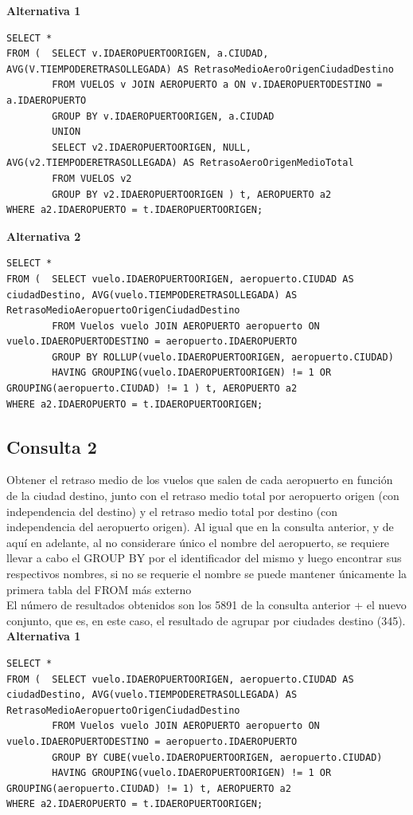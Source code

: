 \documentclass{article}
\begin{document}
\textbf{Alternativa 1}
\begin{lstlisting}
SELECT *
FROM (	SELECT v.IDAEROPUERTOORIGEN, a.CIUDAD, AVG(V.TIEMPODERETRASOLLEGADA) AS RetrasoMedioAeroOrigenCiudadDestino
		FROM VUELOS v JOIN AEROPUERTO a ON v.IDAEROPUERTODESTINO = a.IDAEROPUERTO 
		GROUP BY v.IDAEROPUERTOORIGEN, a.CIUDAD 
		UNION
		SELECT v2.IDAEROPUERTOORIGEN, NULL,  AVG(v2.TIEMPODERETRASOLLEGADA) AS RetrasoAeroOrigenMedioTotal
		FROM VUELOS v2 
		GROUP BY v2.IDAEROPUERTOORIGEN ) t, AEROPUERTO a2
WHERE a2.IDAEROPUERTO = t.IDAEROPUERTOORIGEN;
\end{lstlisting}

\textbf{Alternativa 2}
\begin{lstlisting}
SELECT *
FROM (	SELECT vuelo.IDAEROPUERTOORIGEN, aeropuerto.CIUDAD AS ciudadDestino, AVG(vuelo.TIEMPODERETRASOLLEGADA) AS RetrasoMedioAeropuertoOrigenCiudadDestino
		FROM Vuelos vuelo JOIN AEROPUERTO aeropuerto ON vuelo.IDAEROPUERTODESTINO = aeropuerto.IDAEROPUERTO 
		GROUP BY ROLLUP(vuelo.IDAEROPUERTOORIGEN, aeropuerto.CIUDAD)
		HAVING GROUPING(vuelo.IDAEROPUERTOORIGEN) != 1 OR GROUPING(aeropuerto.CIUDAD) != 1 ) t, AEROPUERTO a2
WHERE a2.IDAEROPUERTO = t.IDAEROPUERTOORIGEN;
\end{lstlisting}

\newpage
\subsection{Consulta 2}

Obtener el retraso medio de los vuelos que salen de cada aeropuerto en función de la ciudad destino, junto con el retraso medio total por aeropuerto origen (con independencia del destino) y el retraso medio total por destino (con independencia del aeropuerto origen).  Al igual que en la consulta anterior, y de aquí en adelante, al no considerare único el nombre del aeropuerto, se requiere llevar a cabo el GROUP BY por el identificador del mismo y luego encontrar sus respectivos nombres, si no se requerie el nombre se puede mantener únicamente la primera tabla del FROM más externo\\

El número de resultados obtenidos son los 5891 de la consulta anterior + el nuevo conjunto, que es, en este caso, el resultado de agrupar por ciudades destino (345).\\

\textbf{Alternativa 1}
\begin{lstlisting}
SELECT *
FROM (	SELECT vuelo.IDAEROPUERTOORIGEN, aeropuerto.CIUDAD AS ciudadDestino, AVG(vuelo.TIEMPODERETRASOLLEGADA) AS RetrasoMedioAeropuertoOrigenCiudadDestino
		FROM Vuelos vuelo JOIN AEROPUERTO aeropuerto ON vuelo.IDAEROPUERTODESTINO = aeropuerto.IDAEROPUERTO 
		GROUP BY CUBE(vuelo.IDAEROPUERTOORIGEN, aeropuerto.CIUDAD)
		HAVING GROUPING(vuelo.IDAEROPUERTOORIGEN) != 1 OR GROUPING(aeropuerto.CIUDAD) != 1) t, AEROPUERTO a2
WHERE a2.IDAEROPUERTO = t.IDAEROPUERTOORIGEN;
\end{lstlisting}
\end{document}

